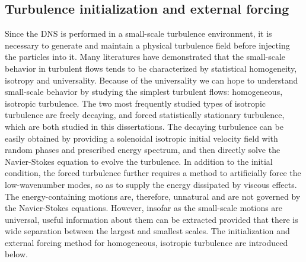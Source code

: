 \subsection{Turbulence initialization and external forcing}
Since the DNS is performed in a small-scale turbulence environment, it is necessary to generate and maintain a physical turbulence field before injecting the particles into it. Many literatures \cite{Eswaran1988} have demonstrated that the small-scale behavior in turbulent flows tends to be characterized by statistical homogeneity, isotropy and universality. Because of the universality we can hope to understand small-scale behavior by studying the simplest turbulent flows: homogeneous, isotropic turbulence. The two most frequently studied types of isotropic turbulence are freely decaying, and forced statistically stationary turbulence, which are both studied in this dissertations. The decaying turbulence can be easily obtained by providing a solenoidal isotropic initial velocity field with random phases and prescribed energy spectrum, and then directly solve the Navier-Stokes equation to evolve the turbulence. In addition to the initial condition, the forced turbulence further requires a method to artificially force the low-wavenumber modes, so as to supply the energy dissipated by viscous effects. The energy-containing motions are, therefore, unnatural and are not governed by the Navier-Stokes equations. However, insofar as the small-scale motions are universal, useful information about them can be extracted provided that there is wide separation between the largest and smallest scales. The initialization and external forcing method for homogeneous, isotropic turbulence are introduced below. 

